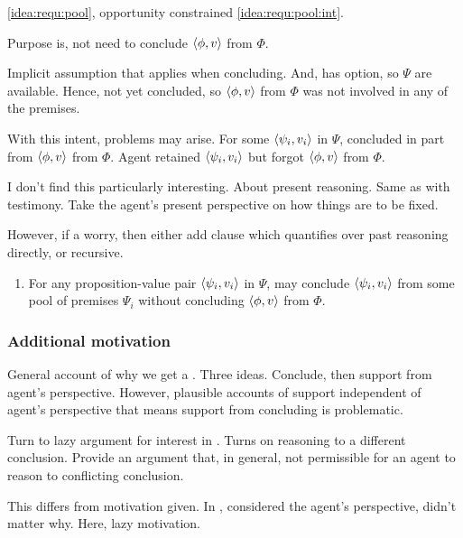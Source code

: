 \begin{note}
  \ref{idea:requ:pool}, opportunity constrained \ref{idea:requ:pool:int}.

  Purpose is, not need to conclude \(\langle \phi, v \rangle\) from \(\Phi\).

  Implicit assumption that \requ{} applies when concluding.
  And, has option, so \(\Psi\) are available.
  Hence, not yet concluded, so \(\langle \phi, v \rangle\) from \(\Phi\) was not involved in any of the premises.

  With this intent, problems may arise.
  For some \(\langle \psi_{i}, v_{i} \rangle\) in \(\Psi\), concluded in part from \(\langle \phi, v \rangle\) from \(\Phi\).
  Agent retained \(\langle \psi_{i}, v_{i} \rangle\) but forgot \(\langle \phi, v \rangle\) from \(\Phi\).

  I don't find this particularly interesting.
  About present reasoning.
  Same as with testimony.
  Take the agent's present perspective on how things are to be fixed.

  However, if a worry, then either add clause which quantifies over past reasoning directly, or recursive.

  \begin{enumerate}
  \item
    \label{idea:requ:pool:ind}
    For any proposition-value pair \(\langle \psi_{i}, v_{i} \rangle\) in \(\Psi\), \vAgent{} may conclude \(\langle \psi_{i}, v_{i} \rangle\) from some pool of premises \(\Psi_{i}\) without concluding \(\langle \phi, v \rangle\) from \(\Phi\).
  \end{enumerate}
\end{note}

\subsubsection{Additional motivation}

\begin{note}
  General account of why we get a \requ{}.
  Three ideas.
  Conclude, then support from agent's perspective.
  However, plausible accounts of support independent of agent's perspective that means support from concluding is problematic.
\end{note}

\begin{note}
  Turn to lazy argument for interest in \requ{}.
  Turns on reasoning to a different conclusion.
  Provide an argument that, in general, not permissible for an agent to reason to conflicting conclusion.

  This differs from motivation given.
  In , considered the agent's perspective, didn't matter why.
  Here, lazy motivation.
\end{note}

